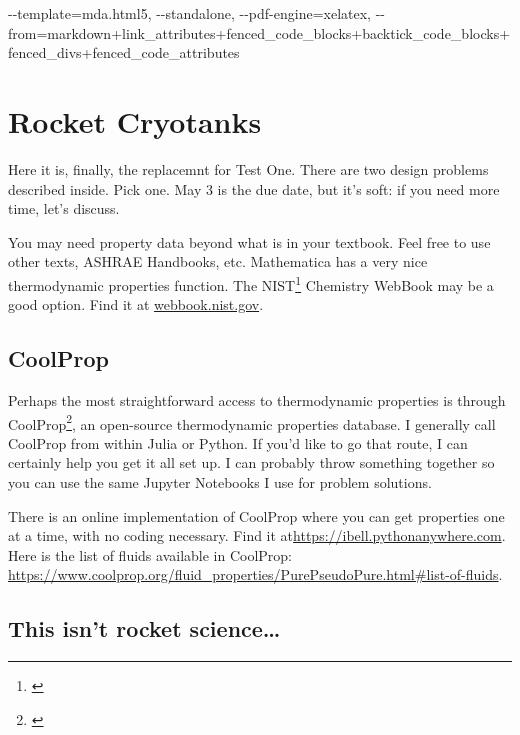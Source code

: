 \documentclass[
]{book}
\newenvironment{Shaded}{\begin{snugshade}}{\end{snugshade}}
\newcommand{\ExtensionTok}[1]{#1}
\newcommand{\NormalTok}[1]{#1}
\begin{document}
\begin{Shaded}
\begin{Highlighting}[]
\ExtensionTok{{-}{-}template}\NormalTok{=mda.html5, {-}{-}standalone, {-}{-}pdf{-}engine=xelatex, {-}{-}from=markdown+link\_attributes+fenced\_code\_blocks+backtick\_code\_blocks+fenced\_divs+fenced\_code\_attributes}
\end{Highlighting}
\end{Shaded}

\hypertarget{rocket-cryotanks}{%
\chapter{Rocket Cryotanks}\label{rocket-cryotanks}}

Here it is, finally, the replacemnt for Test One. There are two design problems described inside. Pick one. May 3 is the due date, but it's soft: if you need more time, let's discuss.

You may need property data beyond what is in your textbook. Feel free to use other texts, ASHRAE Handbooks, etc. Mathematica has a very nice thermodynamic properties function. The NIST\footnote{\citet{linstrom_nist_2019}} Chemistry WebBook may be a good option. Find it at \url{webbook.nist.gov}.

\hypertarget{coolprop}{%
\section{CoolProp}\label{coolprop}}

Perhaps the most straightforward access to thermodynamic properties is through CoolProp\footnote{\citet{bell_pure_2014}}, an open-source thermodynamic properties database.
I generally call CoolProp from within Julia or Python.
If you'd like to go that route, I can certainly help you get it all set up.
I can probably throw something together so you can use the same Jupyter Notebooks I use for problem solutions.

There is an online implementation of CoolProp where you can get properties one at a time, with no coding necessary.
Find it at\url{https://ibell.pythonanywhere.com}.
Here is the list of fluids available in CoolProp: \url{https://www.coolprop.org/fluid_properties/PurePseudoPure.html#list-of-fluids}.

\hypertarget{this-isnt-rocket-science}{%
\section{This isn't rocket science\ldots{}}\label{this-isnt-rocket-science}}
\end{document}
